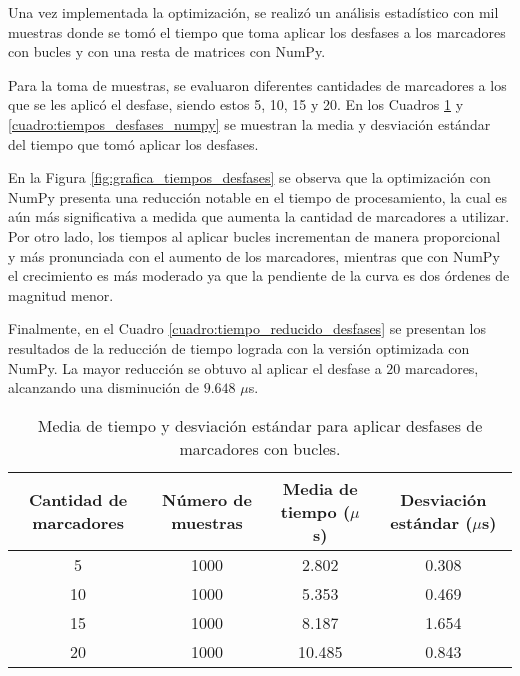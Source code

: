 Una vez implementada la optimización, se realizó un análisis estadístico con mil muestras donde se tomó el tiempo que toma aplicar los desfases a los marcadores con bucles y con una resta de matrices con NumPy.

Para la toma de muestras, se evaluaron diferentes cantidades de marcadores a los que se les aplicó el desfase, siendo estos 5, 10, 15 y 20. En los Cuadros \ref{cuadro:tiempos_desfases_for} y \ref{cuadro:tiempos_desfases_numpy} se muestran la media y desviación estándar del tiempo que tomó aplicar los desfases.

En la Figura \ref{fig:grafica_tiempos_desfases} se observa que la optimización con NumPy presenta una reducción notable en el tiempo de procesamiento, la cual es aún más significativa a medida que aumenta la cantidad de marcadores a utilizar. Por otro lado, los tiempos al aplicar bucles incrementan de manera proporcional y más pronunciada con el aumento de los marcadores, mientras que con NumPy el crecimiento es más moderado ya que la pendiente de la curva es dos órdenes de magnitud menor.

Finalmente, en el Cuadro \ref{cuadro:tiempo_reducido_desfases} se presentan los resultados de la reducción de tiempo lograda con la versión optimizada con NumPy. La mayor reducción se obtuvo al aplicar el desfase a $20$ marcadores, alcanzando una disminución de $9.648$ $\mu$s.

\begin{table}[H]
	\centering
	\resizebox{\textwidth}{!} {
	\begin{tabular}{|c|c|c|c|}
		\hline
		\textbf{Cantidad de marcadores} & \textbf{Número de muestras} & \textbf{Media de tiempo ($\mu$s)} & \textbf{Desviación estándar ($\mu$s)} \\ \hline
		5                               & 1000                        & 2.802                         & 0.308                             \\ \hline
		10                              & 1000                        & 5.353                         & 0.469                             \\ \hline
		15                              & 1000                        & 8.187                         & 1.654                             \\ \hline
		20                              & 1000                        & 10.485                        & 0.843                             \\ \hline
	\end{tabular}}
	\caption{Media de tiempo y desviación estándar para aplicar desfases de marcadores con bucles.}
	\label{cuadro:tiempos_desfases_for}
\end{table}

